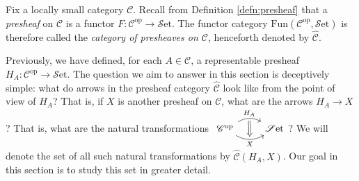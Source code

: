 \documentclass[10pt,oneside]{book}
\def\~#1{\mathscr{#1}}
\def\pre#1{\widehat{#1}}
\newcommand{\op}{\mathrm{op}}
\newcommand{\Fun}{\mathrm{Fun}}
\newcommand{\Set}{\~S\mathrm{et}}
\theoremstyle{plain}
\theoremstyle{definition}
\theoremstyle{remark}
\numberwithin{equation}{section}
\numberwithin{figure}{section}
\begin{document}
Fix a locally small category $\~C$. Recall from Definition \ref{defn:presheaf} that a \emph{presheaf} on $\~C$ is a functor $F: \~C^\op \to \Set$. The functor category $\Fun(\~C^\op, \Set)$ is therefore called the \emph{category of presheaves on $\~C$}, henceforth denoted by $\pre{\~C}$. 

Previously, we have defined, for each $A \in \~C$, a representable presheaf $H_A: \~C^\op  \to \Set$. The question we aim to answer in this section is deceptively simple: what do arrows in the presheaf category $\pre{\~C}$ look like from the point of view of $H_A$? That is, if $X$ is another presheaf on $\~C$, what are the arrows $H_A \to X$? That is, what are the natural transformations $\begin{tikzcd}
    {\~C^\op} & \Set
    \arrow[""{name=0, anchor=center, inner sep=0}, "{H_A}", bend left, from=1-1, to=1-2]
    \arrow[""{name=1, anchor=center, inner sep=0}, "X"', bend right, from=1-1, to=1-2]
    \arrow[shorten <=2pt, shorten >=2pt, Rightarrow, from=0, to=1]
\end{tikzcd}$? We will denote the set of all such natural transformations by $\pre{\~C}(H_A, X)$. Our goal in this section is to study this set in greater detail. 
\end{document}
